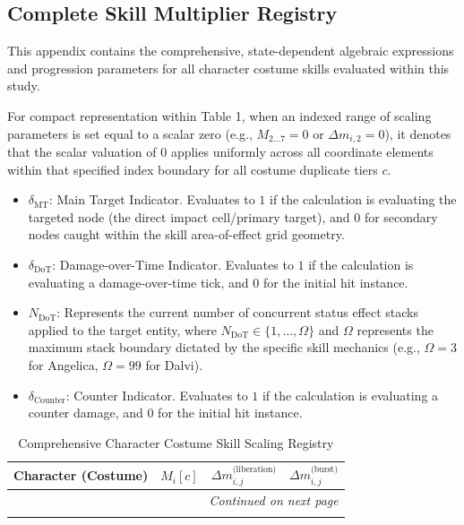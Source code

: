 \documentclass[twocolumn,10pt]{article}
\begin{document}
\clearpage
\onecolumn
\appendix
\begin{landscape}

\section{Complete Skill Multiplier Registry} \label{app:skill_scaling}

This appendix contains the comprehensive, state-dependent algebraic expressions and progression parameters for all character costume skills evaluated within this study.

For compact representation within Table 1, when an indexed range of scaling parameters is set equal to a scalar zero (e.g., $M_{2\dots 7} = 0$ or $\Delta m_{i,2} = 0$), it denotes that the scalar valuation of 0 applies uniformly across all coordinate elements within that specified index boundary for all costume duplicate tiers $c$.

\begin{itemize}
    \item $\delta_{\text{MT}}$: Main Target Indicator. Evaluates to $1$ if the calculation is evaluating the targeted node (the direct impact cell/primary target), and $0$ for secondary nodes caught within the skill area-of-effect grid geometry.
    \item $\delta_{\text{DoT}}$: Damage-over-Time Indicator. Evaluates to $1$ if the calculation is evaluating a damage-over-time tick, and $0$ for the initial hit instance.
    \item $N_{\text{DoT}}$: Represents the current number of concurrent status effect stacks applied to the target entity, where $N_{\text{DoT}} \in \{1, \dots, \Omega\}$ and $\Omega$ represents the maximum stack boundary dictated by the specific skill mechanics (e.g., $\Omega = 3$ for Angelica, $\Omega = 99$ for Dalvi).
    \item $\delta_{\text{Counter}}$: Counter Indicator. Evaluates to $1$ if the calculation is evaluating a counter damage, and $0$ for the initial hit instance.
\end{itemize}

\centering
\begin{longtable}{lccc}
\caption{Comprehensive Character Costume Skill Scaling Registry} \label{app:skill_registry} \\
\toprule
\textbf{Character (Costume)} & \bf{$M_i[c]$} & $\Delta m_{i,j}^{\text{(liberation)}}$ & $\Delta m_{i,j}^{\text{(burst)}}$ \\
\midrule
\endhead
\midrule
\multicolumn{4}{r}{\textit{Continued on next page}} \\
\endfoot
\bottomrule
\endlastfoot


\end{longtable}
\end{landscape}
\end{document}
